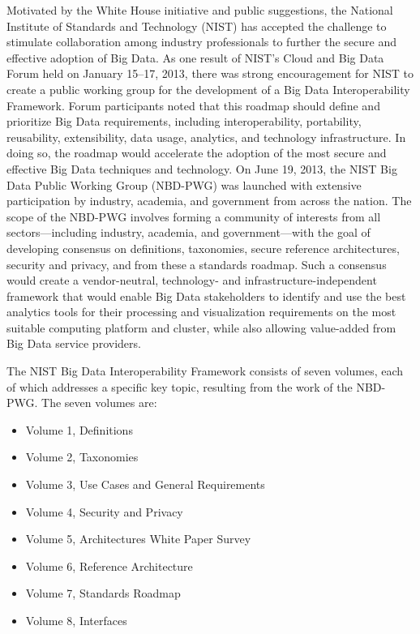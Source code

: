 \documentclass[11pt]{article}
\begin{document}
Motivated by the White House initiative and public suggestions, the National Institute of Standards and 
Technology (NIST) has accepted the challenge to stimulate collaboration among industry professionals to 
further the secure and effective adoption of Big Data. As one result of NIST’s Cloud and Big Data Forum 
held on January 15–17, 2013, there was strong encouragement for NIST to create a public working group 
for the development of a Big Data Interoperability Framework. Forum participants noted that this 
roadmap should define and prioritize Big Data requirements, including interoperability, portability, 
reusability, extensibility, data usage, analytics, and technology infrastructure. In doing so, the roadmap 
would accelerate the adoption of the most secure and effective Big Data techniques and technology.
On June 19, 2013, the NIST Big Data Public Working Group (NBD-PWG) was launched with extensive 
participation by industry, academia, and government from across the nation. The scope of the NBD-PWG 
involves forming a community of interests from all sectors—including industry, academia, and 
government—with the goal of developing consensus on definitions, taxonomies, secure reference 
architectures, security and privacy, andfrom thesea standards roadmap. Such a consensus would 
create a vendor-neutral, technology- and infrastructure-independent framework that would enable Big 
Data stakeholders to identify and use the best analytics tools for their processing and visualization 
requirements on the most suitable computing platform and cluster, while also allowing value-added from 
Big Data service providers.

The NIST Big Data Interoperability Framework consists of seven volumes, each of which addresses a 
specific key topic, resulting from the work of the NBD-PWG. The seven volumes are:

\begin{itemize}
\item	Volume 1, Definitions
\item	Volume 2, Taxonomies 
\item	Volume 3, Use Cases and General Requirements
\item	Volume 4, Security and Privacy 
\item	Volume 5, Architectures White Paper Survey
\item	Volume 6, Reference Architecture
\item	Volume 7, Standards Roadmap
\item       Volume 8, Interfaces
\end{itemize}
\end{document}
